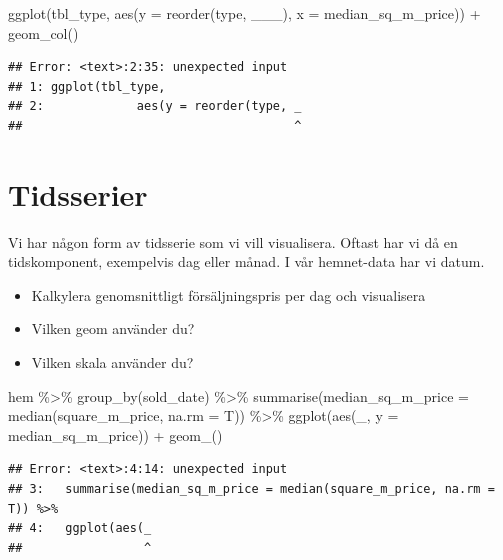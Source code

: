 \documentclass[
]{book}
\newenvironment{Shaded}{\begin{snugshade}}{\end{snugshade}}
\newcommand{\AttributeTok}[1]{\textcolor[rgb]{0.77,0.63,0.00}{#1}}
\newcommand{\FunctionTok}[1]{\textcolor[rgb]{0.00,0.00,0.00}{#1}}
\newcommand{\NormalTok}[1]{#1}
\newcommand{\SpecialCharTok}[1]{\textcolor[rgb]{0.00,0.00,0.00}{#1}}
\providecommand{\tightlist}{%
  \setlength{\itemsep}{0pt}\setlength{\parskip}{0pt}}
\begin{document}
\begin{Shaded}
\begin{Highlighting}[]
\FunctionTok{ggplot}\NormalTok{(tbl\_type, }
            \FunctionTok{aes}\NormalTok{(}\AttributeTok{y =} \FunctionTok{reorder}\NormalTok{(type, \_\_\_),}
                \AttributeTok{x =}\NormalTok{ median\_sq\_m\_price)) }\SpecialCharTok{+}
  \FunctionTok{geom\_col}\NormalTok{()}
\end{Highlighting}
\end{Shaded}

\begin{verbatim}
## Error: <text>:2:35: unexpected input
## 1: ggplot(tbl_type, 
## 2:             aes(y = reorder(type, _
##                                      ^
\end{verbatim}

\hypertarget{tidsserier}{%
\section{Tidsserier}\label{tidsserier}}

Vi har någon form av tidsserie som vi vill visualisera. Oftast har vi då en tidskomponent, exempelvis dag eller månad. I vår hemnet-data har vi datum.

\begin{itemize}
\tightlist
\item
  Kalkylera genomsnittligt försäljningspris per dag och visualisera
\item
  Vilken geom använder du?
\item
  Vilken skala använder du?
\end{itemize}

\begin{Shaded}
\begin{Highlighting}[]
\NormalTok{ hem }\SpecialCharTok{\%\textgreater{}\%} 
  \FunctionTok{group\_by}\NormalTok{(sold\_date) }\SpecialCharTok{\%\textgreater{}\%} 
  \FunctionTok{summarise}\NormalTok{(}\AttributeTok{median\_sq\_m\_price =} \FunctionTok{median}\NormalTok{(square\_m\_price, }\AttributeTok{na.rm =}\NormalTok{ T)) }\SpecialCharTok{\%\textgreater{}\%} 
  \FunctionTok{ggplot}\NormalTok{(}\FunctionTok{aes}\NormalTok{(\_, }\AttributeTok{y =}\NormalTok{ median\_sq\_m\_price)) }\SpecialCharTok{+}
  \FunctionTok{geom\_}\NormalTok{()}
\end{Highlighting}
\end{Shaded}

\begin{verbatim}
## Error: <text>:4:14: unexpected input
## 3:   summarise(median_sq_m_price = median(square_m_price, na.rm = T)) %>% 
## 4:   ggplot(aes(_
##                 ^
\end{verbatim}
\end{document}
